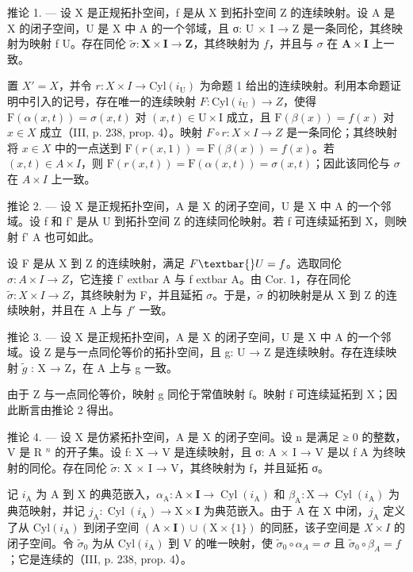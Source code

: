 推论 1. --- 设 X 是正规拓扑空间，f 是从 X 到拓扑空间 Z 的连续映射。设 A 是 X 的闭子空间，U 是 X 中 A 的一个邻域，且 σ: U × I → Z 是一条同伦，其终映射为映射 f \textbar{} U。存在同伦 \(\widetilde{\sigma}\colon\mathbf{X}\times\mathbf{I}\to\mathbf{Z}\)，其终映射为 \(f\)，并且与 \(\sigma\) 在 \(\mathbf{A}\times\mathbf{I}\) 上一致。

置 \(X' = X\)，并令 \(r: X \times I \to \text{Cyl}(i_{\text{U}})\) 为命题 1 给出的连续映射。利用本命题证明中引入的记号，存在唯一的连续映射 \(F: \text{Cyl}(i_{\text{U}}) \to Z\)，使得 \(\text{F}(\alpha(x,t)) = \sigma(x,t)\) 对 \((x,t) \in \text{U} \times \text{I}\) 成立，且 \(\text{F}(\beta(x)) = f(x)\) 对 \(x \in X\) 成立（III, p. 238, prop. 4）。映射 \(F \circ r: X \times I \to Z\) 是一条同伦；其终映射将 \(x \in X\) 中的一点送到 \(\text{F}(r(x,1)) = \text{F}(\beta(x)) = f(x)\)。若 \((x,t) \in A \times I\)，则 \(\text{F}(r(x,t)) = \text{F}(\alpha(x,t)) = \sigma(x,t)\)；因此该同伦与 \(\sigma\) 在 \(A \times I\) 上一致。

推论 2. --- 设 X 是正规拓扑空间，A 是 X 的闭子空间，U 是 X 中 A 的一个邻域。设 f 和 f' 是从 U 到拓扑空间 Z 的连续同伦映射。若 f 可连续延拓到 X，则映射 f' \textbar{} A 也可如此。

设 F 是从 X 到 Z 的连续映射，满足 \(F \textbar{} U = f\)。选取同伦 \(\sigma\colon A \times I \to Z\)，它连接 f'	extbar{} A 与 f	extbar{} A。由 Cor. 1，存在同伦 \(\widetilde{\sigma}\colon X \times I \to Z\)，其终映射为 F，并且延拓 \(\sigma\)。于是，\(\widetilde{\sigma}\) 的初映射是从 X 到 Z 的连续映射，并且在 A 上与 \(f'\) 一致。

推论 3. — 设 X 是正规拓扑空间，A 是 X 的闭子空间，U 是 X 中 A 的一个邻域。设 Z 是与一点同伦等价的拓扑空间，且 g: U → Z 是连续映射。存在连续映射 \(\widetilde{g}\) : X → Z，在 A 上与 g 一致。

由于 Z 与一点同伦等价，映射 g 同伦于常值映射 f。映射 f 可连续延拓到 X；因此断言由推论 2 得出。

推论 4. --- 设 X 是仿紧拓扑空间，A 是 X 的闭子空间。设 n 是满足 ≥ 0 的整数，V 是 R \(^{n}\) 的开子集。设 f: X → V 是连续映射，且 σ: A × I → V 是以 f \textbar{} A 为终映射的同伦。存在同伦 \(\widetilde{\sigma}\): X × I → V，其终映射为 f，并且延拓 σ。

记 \(i_{\mathrm{A}}\) 为 A 到 X 的典范嵌入，\(\alpha_{\mathrm{A}}: \mathrm{A} \times \mathbf{I} \to \operatorname{Cyl}(i_{\mathrm{A}})\) 和 \(\beta_{\mathrm{A}}: \mathrm{X} \to \operatorname{Cyl}(i_{\mathrm{A}})\) 为典范映射，并记 \(j_{\mathrm{A}}: \operatorname{Cyl}(i_{\mathrm{A}}) \to \mathrm{X} \times \mathbf{I}\) 为典范嵌入。由于 A 在 X 中闭，\(j_{\mathrm{A}}\) 定义了从 \(\mathrm{Cyl}(i_{\mathrm{A}})\) 到闭子空间 \((\mathrm{A}\times\mathbf{I})\cup(\mathrm{X}\times\{1\})\) 的同胚，该子空间是 \(X\times I\) 的闭子空间。令 \(\widetilde{\sigma}_{0}\) 为从 \(\mathrm{Cyl}(i_{\mathrm{A}})\) 到 V 的唯一映射，使 \(\widetilde{\sigma}_{0}\circ\alpha_{A}=\sigma\) 且 \(\widetilde{\sigma}_{0}\circ\beta_{A}=f\)；它是连续的（III, p. 238, prop. 4）。

